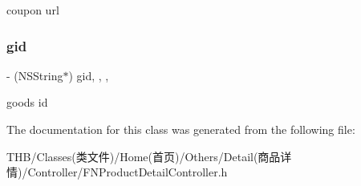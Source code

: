 coupon url \mbox{\label{interface_f_n_product_detail_controller_ae35637b78716e81fe6fb4c8d1447d870}} 
\subsubsection{\texorpdfstring{gid}{gid}}
{\footnotesize\ttfamily -\/ (N\+S\+String$\ast$) gid\hspace{0.3cm}{\ttfamily [read]}, {\ttfamily [write]}, {\ttfamily [nonatomic]}, {\ttfamily [copy]}}

goods id 

The documentation for this class was generated from the following file\+:\begin{DoxyCompactItemize}
\item 
T\+H\+B/\+Classes(类文件)/\+Home(首页)/\+Others/\+Detail(商品详情)/\+Controller/F\+N\+Product\+Detail\+Controller.\+h\end{DoxyCompactItemize}
